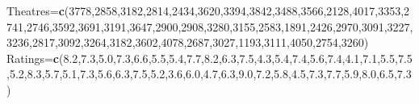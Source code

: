 \documentclass[
]{article}
\newenvironment{Shaded}{\begin{snugshade}}{\end{snugshade}}
\newcommand{\DecValTok}[1]{\textcolor[rgb]{0.00,0.00,0.81}{#1}}
\newcommand{\FloatTok}[1]{\textcolor[rgb]{0.00,0.00,0.81}{#1}}
\newcommand{\FunctionTok}[1]{\textcolor[rgb]{0.13,0.29,0.53}{\textbf{#1}}}
\newcommand{\NormalTok}[1]{#1}
\newcommand{\OtherTok}[1]{\textcolor[rgb]{0.56,0.35,0.01}{#1}}
\begin{document}
\begin{Shaded}
\begin{Highlighting}[]
\NormalTok{Theatres}\OtherTok{=}\FunctionTok{c}\NormalTok{(}\DecValTok{3778}\NormalTok{,}\DecValTok{2858}\NormalTok{,}\DecValTok{3182}\NormalTok{,}\DecValTok{2814}\NormalTok{,}\DecValTok{2434}\NormalTok{,}\DecValTok{3620}\NormalTok{,}\DecValTok{3394}\NormalTok{,}\DecValTok{3842}\NormalTok{,}\DecValTok{3488}\NormalTok{,}\DecValTok{3566}\NormalTok{,}\DecValTok{2128}\NormalTok{,}\DecValTok{4017}\NormalTok{,}\DecValTok{3353}\NormalTok{,}\DecValTok{2741}\NormalTok{,}\DecValTok{2746}\NormalTok{,}\DecValTok{3592}\NormalTok{,}\DecValTok{3691}\NormalTok{,}\DecValTok{3191}\NormalTok{,}\DecValTok{3647}\NormalTok{,}\DecValTok{2900}\NormalTok{,}\DecValTok{2908}\NormalTok{,}\DecValTok{3280}\NormalTok{,}\DecValTok{3155}\NormalTok{,}\DecValTok{2583}\NormalTok{,}\DecValTok{1891}\NormalTok{,}\DecValTok{2426}\NormalTok{,}\DecValTok{2970}\NormalTok{,}\DecValTok{3091}\NormalTok{,}\DecValTok{3227}\NormalTok{,}\DecValTok{3236}\NormalTok{,}\DecValTok{2817}\NormalTok{,}\DecValTok{3092}\NormalTok{,}\DecValTok{3264}\NormalTok{,}\DecValTok{3182}\NormalTok{,}\DecValTok{3602}\NormalTok{,}\DecValTok{4078}\NormalTok{,}\DecValTok{2687}\NormalTok{,}\DecValTok{3027}\NormalTok{,}\DecValTok{1193}\NormalTok{,}\DecValTok{3111}\NormalTok{,}\DecValTok{4050}\NormalTok{,}\DecValTok{2754}\NormalTok{,}\DecValTok{3260}\NormalTok{)}
\NormalTok{Ratings}\OtherTok{=}\FunctionTok{c}\NormalTok{(}\FloatTok{8.2}\NormalTok{,}\FloatTok{7.3}\NormalTok{,}\FloatTok{5.0}\NormalTok{,}\FloatTok{7.3}\NormalTok{,}\FloatTok{6.6}\NormalTok{,}\FloatTok{5.5}\NormalTok{,}\FloatTok{5.4}\NormalTok{,}\FloatTok{7.7}\NormalTok{,}\FloatTok{8.2}\NormalTok{,}\FloatTok{6.3}\NormalTok{,}\FloatTok{7.5}\NormalTok{,}\FloatTok{4.3}\NormalTok{,}\FloatTok{5.4}\NormalTok{,}\FloatTok{7.4}\NormalTok{,}\FloatTok{5.6}\NormalTok{,}\FloatTok{7.4}\NormalTok{,}\FloatTok{4.1}\NormalTok{,}\FloatTok{7.1}\NormalTok{,}\FloatTok{5.5}\NormalTok{,}\FloatTok{7.5}\NormalTok{,}\FloatTok{5.2}\NormalTok{,}\FloatTok{8.3}\NormalTok{,}\FloatTok{5.7}\NormalTok{,}\FloatTok{5.1}\NormalTok{,}\FloatTok{7.3}\NormalTok{,}\FloatTok{5.6}\NormalTok{,}\FloatTok{6.3}\NormalTok{,}\FloatTok{7.5}\NormalTok{,}\FloatTok{5.2}\NormalTok{,}\FloatTok{3.6}\NormalTok{,}\FloatTok{6.0}\NormalTok{,}\FloatTok{4.7}\NormalTok{,}\FloatTok{6.3}\NormalTok{,}\FloatTok{9.0}\NormalTok{,}\FloatTok{7.2}\NormalTok{,}\FloatTok{5.8}\NormalTok{,}\FloatTok{4.5}\NormalTok{,}\FloatTok{7.3}\NormalTok{,}\FloatTok{7.7}\NormalTok{,}\FloatTok{5.9}\NormalTok{,}\FloatTok{8.0}\NormalTok{,}\FloatTok{6.5}\NormalTok{,}\FloatTok{7.3}\NormalTok{)}

\end{Highlighting}
\end{Shaded}
\end{document}
